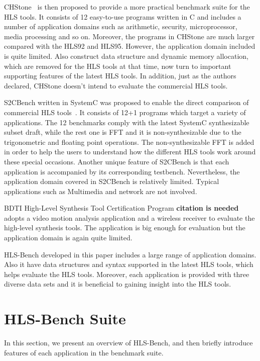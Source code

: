 \documentclass[conference]{IEEEtran}
\begin{document}
CHStone~\cite{hara2008chstone} is then proposed to provide a more practical benchmark suite for the HLS tools. It consists of 12 easy-to-use programs written in C and includes a number of application domains such as arithmetic, security, microprocessor, media processing and so on. Moreover, the programs in CHStone are much larger compared with the HLS92 and HLS95. However, the application domain included is quite limited. Also construct data structure and dynamic memory allocation, which are removed for the HLS tools at that time, now turn to important supporting features of the latest HLS tools. In addition, just as the authors declared, CHStone doesn't intend to evaluate the commercial HLS tools. 

S2CBench written in SystemC was proposed  to enable the direct comparison of commercial HLS tools~\cite{carrions2cbench}. It consists of 12+1 programs which target a variety of applications. The 12 benchmarks comply with the latest SystemC synthesizable subset draft, while the rest one is FFT and it is non-synthesizable due to the trigonometric and floating point operations. The non-synthesizable FFT is added in order to help the users to understand how the different HLS tools work around these special occasions. Another unique feature of S2CBench is that each application is accompanied by its corresponding testbench. Nevertheless, the application domain covered in S2CBench is relatively limited. Typical applications such as Multimedia and network are not involved. 

BDTI High-Level Synthesis Tool Certification Program \textbf{citation is needed} adopts a video motion analysis application and a wireless receiver to evaluate the high-level synthesis tools. The application is big enough for evaluation but the application domain is again quite limited.  

HLS-Bench developed in this paper includes a large range of application domains. Also it have data structures and syntax supported in the latest HLS tools, which helps evaluate the HLS tools. Moreover, each application is provided with three diverse data sets and it is beneficial to gaining insight into the HLS tools.  

\section{HLS-Bench Suite}\label{section_benchmark_suite}
In this section, we present an overview of HLS-Bench, and then briefly introduce features of each application in the benchmark suite. 
\end{document}
